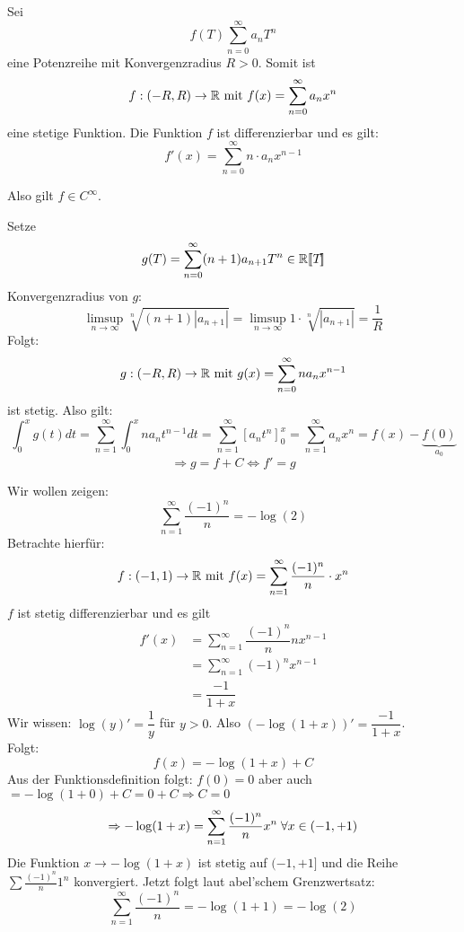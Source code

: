 \documentclass[main.tex]{subfiles}
\begin{document}
\begin{Korollar}
  Sei
  $$f(T) \sum \limits_{n=0}^\infty a_n T^n$$
  eine Potenzreihe mit Konvergenzradius $R > 0$. Somit ist
  $$f:(-R,R) \to \mathbb{R} \text{ mit } f(x) = \sum \limits_{n=0}^\infty a_n x^n$$
  eine stetige Funktion. Die Funktion $f$ ist differenzierbar und es gilt:
  $$f'(x) = \sum \limits_{n=0}^\infty n \cdot a_n x^{n-1}$$
  \begin{Bemerkung}
    Also gilt $f \in C^\infty$.
  \end{Bemerkung}
\end{Korollar}

\begin{Beweis}
  Setze
  $$g(T) = \sum \limits_{n=0}^\infty (n+1) a_{n+1} T^n \in \mathbb{R}[\![T \!]\!]$$
  Konvergenzradius von $g$:
  $$\limsup_{n \to \infty} \sqrt[n]{(n+1) |a_{n+1}|} = \limsup_{n \to \infty} 1 \cdot \sqrt[n]{|a_{n+1}|} = \dfrac{1}{R}$$
  Folgt:
  $$g:(-R,R) \to \mathbb{R} \text{ mit } g(x) = \sum \limits_{n=0}^\infty n a_n x^{n-1}$$
  ist stetig. Also gilt:
  $$\int_0^x g(t)dt = \sum \limits_{n=1}^\infty \int_0^x n a_n t^{n-1} dt =  \sum \limits_{n=1}^\infty [a_n t^n]_0^x =  \sum \limits_{n=1}^\infty a_n x^n = f(x) - \underbrace{f(0)}_{a_0}$$
  $$\Rightarrow g = f + C \Leftrightarrow f' = g$$
\end{Beweis}

\begin{Beispiel}
  Wir wollen zeigen:
  $$\sum \limits_{n = 1}^\infty \dfrac{(-1)^n}{n} = -\log(2)$$
  Betrachte hierfür:
  $$f:(-1,1) \to \mathbb{R} \text{ mit } f(x) = \sum \limits_{n=1}^\infty \dfrac{(-1)^n}{n} \cdot x^n$$
  $f$ ist stetig differenzierbar und es gilt
  $$\begin{aligned}
    f'(x) &= \sum \limits_{n=1}^\infty \dfrac{(-1)^n}{n} n x^{n-1}\\
    &= \sum \limits_{n=1}^\infty (-1)^n x^{n-1}\\
    &= \dfrac{-1}{1+x}
  \end{aligned}$$
  Wir wissen: $\log(y)' = \dfrac{1}{y}$ für $y > 0$. Also $(- \log(1+x))' = \dfrac{-1}{1+x}$.\\
  Folgt:
  $$f(x) = - \log(1+x) + C$$
  Aus der Funktionsdefinition folgt: $f(0) = 0$ aber auch $= - \log(1+0) + C = 0 + C \Rightarrow C = 0$
  $$\Rightarrow -\log(1+x) =\sum \limits_{n=1}^\infty \dfrac{(-1)^n}{n} x^n \;\forall x \in (-1,+1)$$
  Die Funktion $x \to - \log(1+x)$ ist stetig auf $(-1,+1]$ und die Reihe $\sum \frac{(-1)^n}{n} 1^n$ konvergiert. Jetzt folgt laut abel'schem Grenzwertsatz:
  $$\sum \limits_{n = 1}^\infty \dfrac{(-1)^n}{n} = - \log(1+1) = - \log(2)$$
\end{Beispiel}
\end{document}
